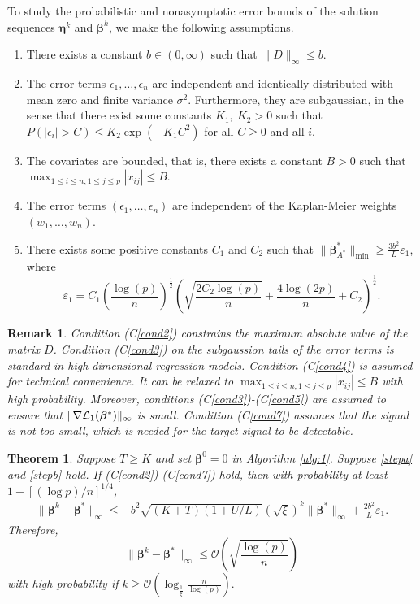 \documentclass[12pt]{article}
\newtheorem{theorem}{Theorem}
\newtheorem{remark}{Remark}
\newcommand{\bbeta}{\boldsymbol{\beta}}
\newcommand{\boldeta}{\boldsymbol{\eta}}
\begin{document}
To study the probabilistic and nonasymptotic error bounds of the solution sequences $\boldeta^k$ and $\bbeta^k$, we make the following assumptions.
\begin{enumerate}[(C1)]
\item
\label{cond2}
There exists a constant $b \in (0,\infty)$ such that $\|D\|_{\infty}\leq b$.
\item
\label{cond3}
The error terms $\epsilon_1,\ldots,\epsilon_n$ are independent and   identically distributed with mean zero and finite variance $\sigma^2$. Furthermore, they are subgaussian, in the sense that there exist some constants $K_1, ~K_2>0$ such that $P(|\epsilon_i|>C)\leq K_2\exp(-K_1C^2)$ for all $C\geq 0$ and all $i$.
\item
\label{cond4}
The covariates are bounded, that is, there exists a constant $B>0$ such that $\max_{1\le i \le n, 1\le j \le p} |x_{ij}|\leq B.$
\item
\label{cond5}
The  error terms $(\epsilon_1,\ldots,\epsilon_n)$ are independent of the Kaplan-Meier weights $(w_1,\ldots,w_n)$.
\item
\label{cond7}
There exists some positive constants $C_1$ and $C_2$ such that
$\|\bbeta^*_{A^*}\|_{\min}\geq \frac{3b^2}{L}\varepsilon_1$, where
\begin{equation*}
\varepsilon_1= C_1\left(\frac{\log(p)}{n}\right)^{\frac{1}{2}}\left(\sqrt{\frac{2C_2\log(p)}{n}}+\frac{4\log(2p)}{n}+C_2\right)^{\frac{1}{2}}.
\end{equation*}
\end{enumerate}
\begin{remark}
Condition
(C\ref{cond2})
 constrains the maximum absolute value of the matrix $D$.
 Condition (C\ref{cond3}) on the subgaussion tails of the error terms is standard in high-dimensional regression models. Condition (C\ref{cond4}) is assumed for technical convenience. It can be relaxed to $\max_{1\le i \le n, 1\le j \le p} |x_{ij}|\leq B$ with high probability.
 Moreover, conditions %
 (C\ref{cond3})-(C\ref{cond5}) are assumed to ensure that
 $\|\nabla {\cal L}_1(\bbeta^*)\|_\infty$ is small.
 Condition
 (C\ref{cond7}) assumes that the signal is not too small, which
 is  needed for the target signal to be detectable.
\end{remark}
\begin{theorem}\label{th1b}
Suppose $T \ge K$ and set $\bbeta^0=0$ in Algorithm \ref{alg:1}.
Suppose \eqref{stepa} and \eqref{stepb} hold.
If
(C\ref{cond2})-(C\ref{cond7})
hold,
then with probability at least
$1- [{(\log p )}/{n}]^{{1}/{4}}$,
\begin{align*}
\|\bbeta^k-\bbeta^*\|_{\infty}\leq & b^2\sqrt{(K+T)(1+U/L)}(\sqrt{\xi})^k\|\bbeta^{*}\|_{\infty}+\frac{2b^2}{L}\varepsilon_1.
\end{align*}
Therefore,
$$\|\bbeta^k-\bbeta^*\|_{\infty}\leq \mathcal{O}\left( \sqrt{\frac{\log(p)}{n}}\right)$$
with high probability if $k \geq \mathcal{O}\left( \log_{\frac{1}{\xi}}\frac{n}{\log(p)} \right).$
\end{theorem}
\end{document}
